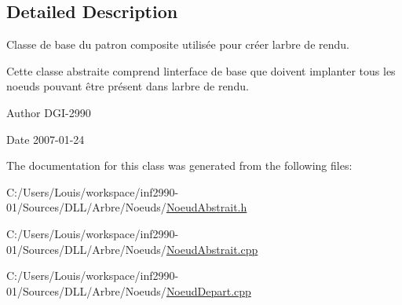 \subsection{Detailed Description}
Classe de base du patron composite utilisée pour créer l\textquotesingle{}arbre de rendu. 

Cette classe abstraite comprend l\textquotesingle{}interface de base que doivent implanter tous les noeuds pouvant être présent dans l\textquotesingle{}arbre de rendu.

\begin{DoxyAuthor}{Author}
D\+G\+I-\/2990 
\end{DoxyAuthor}
\begin{DoxyDate}{Date}
2007-\/01-\/24 
\end{DoxyDate}


The documentation for this class was generated from the following files\+:\begin{DoxyCompactItemize}
\item 
C\+:/\+Users/\+Louis/workspace/inf2990-\/01/\+Sources/\+D\+L\+L/\+Arbre/\+Noeuds/\hyperlink{_noeud_abstrait_8h}{Noeud\+Abstrait.\+h}\item 
C\+:/\+Users/\+Louis/workspace/inf2990-\/01/\+Sources/\+D\+L\+L/\+Arbre/\+Noeuds/\hyperlink{_noeud_abstrait_8cpp}{Noeud\+Abstrait.\+cpp}\item 
C\+:/\+Users/\+Louis/workspace/inf2990-\/01/\+Sources/\+D\+L\+L/\+Arbre/\+Noeuds/\hyperlink{_noeud_depart_8cpp}{Noeud\+Depart.\+cpp}\end{DoxyCompactItemize}
